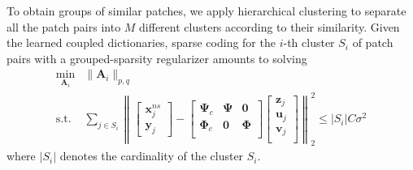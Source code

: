\documentclass{article}
\begin{document}
To obtain groups of similar patches, we apply hierarchical clustering to separate all the patch pairs into $M$ different clusters according to their similarity. 
Given the learned coupled dictionaries, sparse coding for the $i$-th cluster $S_i$ of patch pairs with a grouped-sparsity regularizer amounts to solving
\begin{equation} \label{Eq:BPDN_GroupSparsity}
\begin{array}{cl}
\underset{\mathbf{A}_i}{\min}
& \! \! \! \!
\| \mathbf{A}_i \|_{p,q} \;
\\
\text{s.t.} 
& \! \! \! \!
\sum\limits_{j \in S_i} 
\left\|
\begin{bmatrix} 
\mathbf{x}^{ns}_{j} \\ \mathbf{y}_{j}
\end{bmatrix}
-
\begin{bmatrix}
\boldsymbol{\Psi}_{c} & \boldsymbol{\Psi} & \mathbf{0} \\
\boldsymbol{\Phi}_{c} & \mathbf{0} & \boldsymbol{\Phi} \\
\end{bmatrix}
%
\begin{bmatrix}
\mathbf{z}_j \\
\mathbf{u}_j \\
\mathbf{v}_j \\
\end{bmatrix}
\right\|_2^2
\leq
|S_i| C \sigma^2  
\end{array}
\end{equation}
where $|S_i|$ denotes the cardinality of the cluster $S_i$.

\vspace{-0.2cm}
\end{document}
